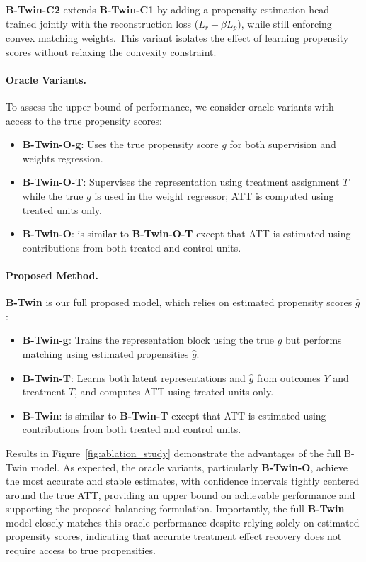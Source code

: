 \documentclass[10pt]{article} %
\begin{document}
\textbf{B-Twin-C2} extends \textbf{B-Twin-C1} by adding a propensity estimation head trained jointly with the reconstruction loss (\(L_r + \beta L_p\)), while still enforcing convex matching weights. This variant isolates the effect of learning propensity scores without relaxing the convexity constraint.



\paragraph{Oracle Variants.}
To assess the upper bound of performance, we consider oracle variants with access to the true propensity scores:
\begin{itemize}
    \item \textbf{B-Twin-O-g}: Uses the true propensity score \(g\) for both supervision and weights regression.
    \item \textbf{B-Twin-O-T}: Supervises the representation using treatment assignment \(T\) while the true \(g\) is used in the weight regressor; ATT is computed using treated units only.
    \item \textbf{B-Twin-O}: is similar to \textbf{B-Twin-O-T} except that ATT is estimated using contributions from both treated and control units.
\end{itemize}

\paragraph{Proposed Method.}
\textbf{B-Twin} is our full proposed model, which relies on estimated propensity scores \(\hat{g}\):
\begin{itemize}
    \item \textbf{B-Twin-g}: Trains the representation block using the true \(g\) but performs matching using estimated propensities \(\hat{g}\).
    \item \textbf{B-Twin-T}: Learns both latent representations and \(\hat{g}\) from outcomes \(Y\) and treatment \(T\), and computes ATT using treated units only.
    \item \textbf{B-Twin}: is similar to \textbf{B-Twin-T} except that ATT is estimated using contributions from both treated and control units.
\end{itemize}

Results in Figure~\ref{fig:ablation_study} demonstrate the advantages of the full B-Twin model. As expected, the oracle variants, particularly \textbf{B-Twin-O}, achieve the most accurate and stable estimates, with confidence intervals tightly centered around the true ATT, providing an upper bound on achievable performance and supporting the proposed balancing formulation.
Importantly, the full \textbf{B-Twin} model closely matches this oracle performance despite relying solely on estimated propensity scores, indicating that accurate treatment effect recovery does not require access to true propensities.
\end{document}
